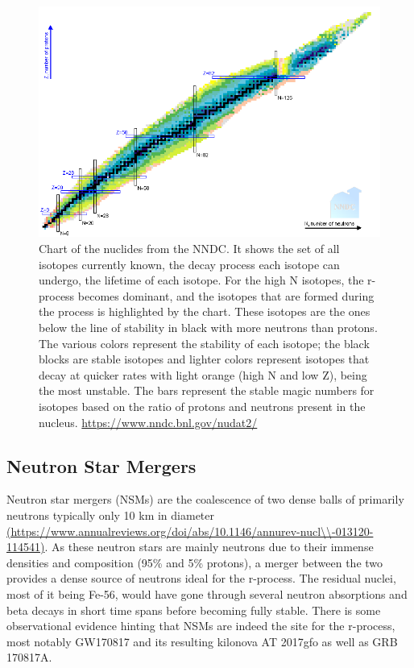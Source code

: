 \documentclass[11pt,a4paper]{article}
\begin{document}
\begin{figure}[h!]
  \includegraphics[width=1\textwidth , scale = .5]{nuclides_chart.png}
  \caption{Chart of the nuclides from the NNDC. It shows the set of all isotopes currently known, the decay process each isotope can undergo, the lifetime of each isotope. For the high N isotopes, the r-process becomes dominant, and the isotopes that are formed during the process is highlighted by the chart. These isotopes are the ones below the line of stability in black with more neutrons than protons. The various colors represent the stability of each isotope; the black blocks are stable isotopes and lighter colors represent isotopes that decay at quicker rates with light orange (high N and low Z), being the most unstable. The bars represent the stable magic numbers for isotopes based on the ratio of protons and neutrons present in the nucleus. \url{https://www.nndc.bnl.gov/nudat2/}}
\end{figure}

\subsection{Neutron Star Mergers}

Neutron star mergers (NSMs) are the coalescence of two dense balls of primarily neutrons typically only 10 km in diameter \url{(https://www.annualreviews.org/doi/abs/10.1146/annurev-nucl\\-013120-114541)}. As these neutron stars are mainly neutrons due to their immense densities and composition (95\% and 5\% protons), a merger between the two provides a dense source of neutrons ideal for the r-process. The residual nuclei, most of it being Fe-56, would have gone through several neutron absorptions and beta decays in short time spans before becoming fully stable. There is some observational evidence hinting that NSMs are indeed the site for the r-process, most notably GW170817 and its resulting kilonova AT 2017gfo as well as GRB 170817A. 
\end{document}
